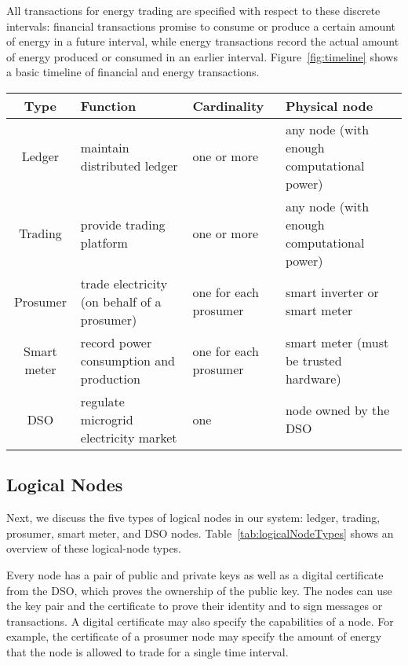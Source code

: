 \documentclass[sigconf]{acmart}
\begin{document}
All transactions for energy trading are specified with respect to these discrete intervals: financial transactions promise to consume or produce a certain amount of energy in a future interval, while energy transactions record the actual amount of energy produced or consumed in an earlier interval. 
Figure~\ref{fig:timeline} shows a basic timeline of financial and energy transactions.

\begin{table*}
\caption{Logical Node Types}
\label{tab:logicalNodeTypes}
\begin{tabular}{|c||l|l|l|}
\hline
\textbf{Type} & \textbf{Function} & \textbf{Cardinality} & \textbf{Physical node} \\
\hline\hline
\rowcolor{Gray} Ledger      & maintain distributed ledger                 & one or more           & any node (with enough computational power) \\ \hline
                Trading     & provide trading platform                    & one or more           & any node (with enough computational power) \\ \hline
\rowcolor{Gray} Prosumer    & trade electricity (on behalf of a prosumer) & one for each prosumer & smart inverter or smart meter \\ \hline
                Smart meter & record power consumption and production     & one for each prosumer & smart meter (must be trusted hardware) \\ \hline
\rowcolor{Gray} DSO         & regulate microgrid electricity market       & one                   & node owned by the DSO \\ \hline
\end{tabular}
\end{table*}

\subsection{Logical Nodes}

Next, we discuss the five types of logical nodes in our system: ledger, trading, prosumer, smart meter, and DSO nodes.
Table~\ref{tab:logicalNodeTypes} shows an overview of these logical-node types.

Every node has a pair of public and private keys as well as a digital certificate from the DSO, which proves the ownership of the public key.
The nodes can use the key pair and the certificate to prove their identity and to sign messages or transactions.
A digital certificate may also specify the capabilities of a node.
For example, the certificate of a prosumer node may specify the amount of energy that the node is allowed to trade for a single time interval.
\end{document}

